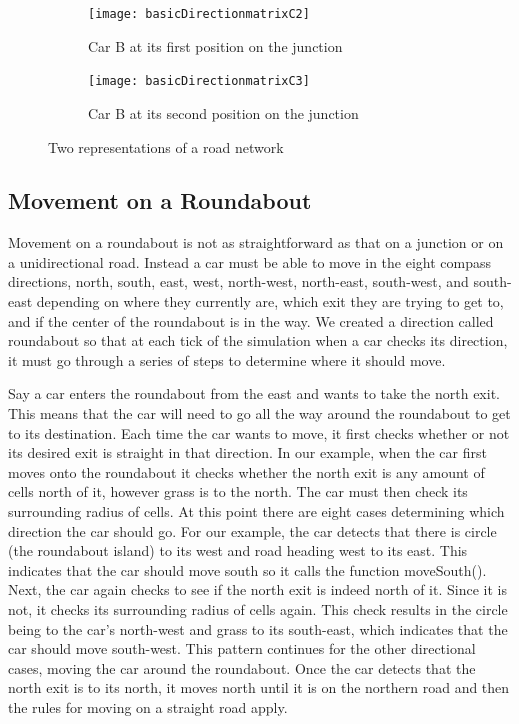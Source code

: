 \documentclass{article}
\begin{document}
	\begin{figure}[H]
		\centering
		
		\begin{subfigure}{0.45\textwidth}
			\centering
			\texttt{[image: basicDirectionmatrixC2]}
			\caption{Car B at its first position on the junction}
			\label{FirstMove}
		\end{subfigure}
		\qquad
		\begin{subfigure}{0.45\textwidth}
			\centering
			\texttt{[image: basicDirectionmatrixC3]}
			\caption{Car B at its second position on the junction}
			\label{SecondMove}
		\end{subfigure}
		\caption{Two representations of a road network}
		\label{Car B in a junction}
	\end{figure}


\subsection{Movement on a Roundabout}\label{movementOnARoundabout}

Movement on a roundabout is not as straightforward as that on a junction or on a unidirectional road. Instead a car must be able to move in the eight compass directions, north, south, east, west, north-west, north-east, south-west, and south-east depending on where they currently are, which exit they are trying to get to, and if the center of the roundabout is in the way. We created a direction called roundabout so that at each tick of the simulation when a car checks its direction, it must go through a series of steps to determine where it should move. 

Say a car enters the roundabout from the east and wants to take the north exit. This means that the car will need to go all the way around the roundabout to get to its destination. 
Each time the car wants to move, it first checks whether or not its desired exit is straight in that direction. In our example, when the car first moves onto the roundabout it checks whether the north exit is any amount of cells north of it, however grass is to the north. The car must then check its surrounding radius of cells. At this point there are eight cases determining which direction the car should go. For our example, the car detects that there is circle (the roundabout island) to its west and road heading west to its east. This indicates that the car should move south so it calls the function moveSouth(). Next, the car again checks to see if the north exit is indeed north of it. Since it is not, it checks its surrounding radius of cells again. This check results in the circle being to the car's north-west and grass to its south-east, which indicates that the car should move south-west. This pattern continues for the other directional cases, moving the car around the roundabout. Once the car detects that the north exit is to its north, it moves north until it is on the northern road and then the rules for moving on a straight road apply.
\end{document}

